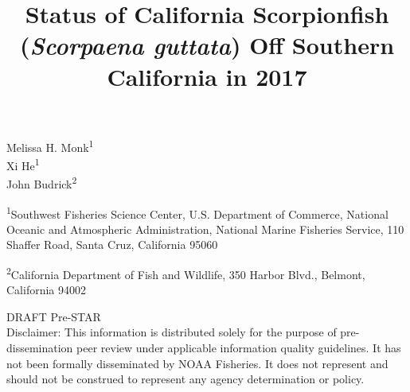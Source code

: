 \documentclass[12pt,]{article}
\title{Status of California Scorpionfish (\emph{Scorpaena guttata}) Off
Southern California in 2017}
\author{}
\date{}
\begin{document}
\maketitle


\begin{center}
\thispagestyle{empty}


\vspace{.5cm}




Melissa H. Monk\textsuperscript{1}\\
Xi He\textsuperscript{1}\\
John Budrick\textsuperscript{2}\\

\vspace{.5cm}

\small
\textsuperscript{1}Southwest Fisheries Science Center, U.S. Department of Commerce, National Oceanic and Atmospheric Administration, National Marine Fisheries Service, 110 Shaffer Road, Santa Cruz, California 95060\\

\vspace{.3cm}

\textsuperscript{2}California Department of Fish and Wildlife, 350 Harbor Blvd., Belmont, California 94002\\


\vspace{.5cm}

\vfill
DRAFT Pre-STAR\\
Disclaimer: This information is distributed solely for the purpose of pre-dissemination
peer review under applicable information quality guidelines. It has not been formally
disseminated by NOAA Fisheries. It does not represent and should not be construed to
represent any agency determination or policy. 


\end{center}
\end{document}
